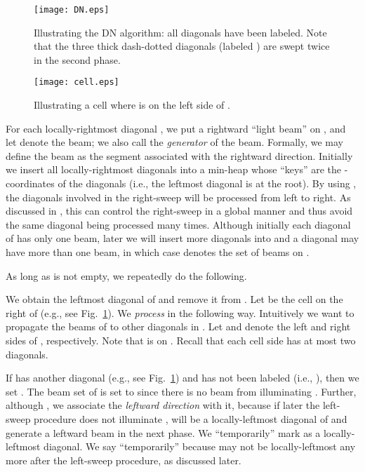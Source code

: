 \documentclass[english,runningheads,11pt]{llncs-revised}
\begin{document}
\begin{figure}[t]
\begin{minipage}[t]{0.60\linewidth}
\begin{center}
\texttt{[image: DN.eps]}
\caption{\footnotesize Illustrating the DN algorithm: all diagonals
have been labeled. Note that the three thick dash-dotted diagonals
(labeled ) are swept twice in the second phase.}
\label{fig:DN}
\end{center}
\end{minipage}
\hspace*{0.05in}
\begin{minipage}[t]{0.38\linewidth}
\begin{center}
\texttt{[image: cell.eps]}
\caption{\footnotesize Illustrating a cell  where  is on the
left side of .}
\label{fig:cell}
\end{center}
\end{minipage}
\vspace{-0.15in}
\end{figure}

For each
locally-rightmost diagonal , we put a rightward ``light beam'' on
, and let  denote the beam;
we also call  the {\em generator} of the beam.
Formally, we may define the beam as the segment  associated with the rightward
direction. Initially we insert all locally-rightmost
diagonals into a min-heap  whose ``keys'' are the -coordinates of the
diagonals (i.e., the leftmost diagonal is at the root).
By using , the diagonals involved in the right-sweep will be processed from left to
right. As discussed in \cite{ref:DasGe91}, this can control the
right-sweep in a global manner and thus avoid the same
diagonal being processed many times.
Although initially each diagonal of  has only one
beam, later we will insert more diagonals into  and a
diagonal  may have more than one beam,
in which case  denotes the set of beams on .

As long as  is not empty, we repeatedly do the following.

We obtain the leftmost diagonal  of  and remove it from .
Let  be the cell on the right of  (e.g., see Fig.~\ref{fig:cell}).
We {\em process}  in the following way. Intuitively we want to
propagate the beams of  to other diagonals in .
Let  and  denote the left and right sides of , respectively.
Note that  is on .  Recall that each cell side has at
most two diagonals.

If  has another diagonal  (e.g., see Fig.~\ref{fig:cell}) and  has
not been labeled (i.e., ), then we set . The beam set
 of  is set to 
since there is no beam from  illuminating .
Further, although , we associate the {\em
leftward direction} with it, because
if later the left-sweep procedure does not illuminate , 
will be a locally-leftmost diagonal of  and
generate a leftward beam in the next phase.
We ``temporarily'' mark  as a locally-leftmost
diagonal.
We say ``temporarily'' because  may not be
locally-leftmost any more after the left-sweep procedure, as discussed later.
\end{document}
